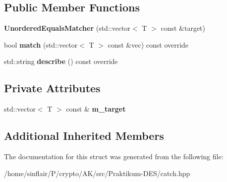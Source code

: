 \subsection*{Public Member Functions}
\begin{DoxyCompactItemize}
\item 
\mbox{\label{structCatch_1_1Matchers_1_1Vector_1_1UnorderedEqualsMatcher_a525905639b2b15b52ddb0bf14bfa19da}} 
{\bfseries Unordered\+Equals\+Matcher} (std\+::vector$<$ T $>$ const \&target)
\item 
\mbox{\label{structCatch_1_1Matchers_1_1Vector_1_1UnorderedEqualsMatcher_a3ccdd9dd2cd8bdbb8bb121acbb9cb358}} 
bool {\bfseries match} (std\+::vector$<$ T $>$ const \&vec) const override
\item 
\mbox{\label{structCatch_1_1Matchers_1_1Vector_1_1UnorderedEqualsMatcher_a7202d811200317abc58c844f663823df}} 
std\+::string {\bfseries describe} () const override
\end{DoxyCompactItemize}
\subsection*{Private Attributes}
\begin{DoxyCompactItemize}
\item 
\mbox{\label{structCatch_1_1Matchers_1_1Vector_1_1UnorderedEqualsMatcher_aaa39871eb4034d4335214215dd693712}} 
std\+::vector$<$ T $>$ const  \& {\bfseries m\+\_\+target}
\end{DoxyCompactItemize}
\subsection*{Additional Inherited Members}


The documentation for this struct was generated from the following file\+:\begin{DoxyCompactItemize}
\item 
/home/sinflair/\+P/crypto/\+A\+K/src/\+Praktikum-\/\+D\+E\+S/catch.\+hpp\end{DoxyCompactItemize}

